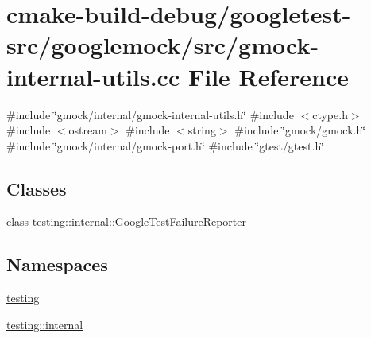 \hypertarget{gmock-internal-utils_8cc}{}\section{cmake-\/build-\/debug/googletest-\/src/googlemock/src/gmock-\/internal-\/utils.cc File Reference}
\label{gmock-internal-utils_8cc}
{\ttfamily \#include \char`\"{}gmock/internal/gmock-\/internal-\/utils.\+h\char`\"{}}\newline
{\ttfamily \#include $<$ctype.\+h$>$}\newline
{\ttfamily \#include $<$ostream$>$}\newline
{\ttfamily \#include $<$string$>$}\newline
{\ttfamily \#include \char`\"{}gmock/gmock.\+h\char`\"{}}\newline
{\ttfamily \#include \char`\"{}gmock/internal/gmock-\/port.\+h\char`\"{}}\newline
{\ttfamily \#include \char`\"{}gtest/gtest.\+h\char`\"{}}\newline
\subsection*{Classes}
\begin{DoxyCompactItemize}
\item 
class \mbox{\hyperlink{classtesting_1_1internal_1_1GoogleTestFailureReporter}{testing\+::internal\+::\+Google\+Test\+Failure\+Reporter}}
\end{DoxyCompactItemize}
\subsection*{Namespaces}
\begin{DoxyCompactItemize}
\item 
 \mbox{\hyperlink{namespacetesting}{testing}}
\item 
 \mbox{\hyperlink{namespacetesting_1_1internal}{testing\+::internal}}
\end{DoxyCompactItemize}
